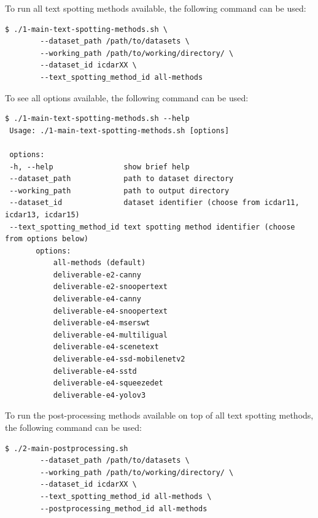To run all text spotting methods available, the following command can be used:

\begin{lstlisting}[style=fancyterminal]
 $ ./1-main-text-spotting-methods.sh \
        --dataset_path /path/to/datasets \
        --working_path /path/to/working/directory/ \
        --dataset_id icdarXX \
        --text_spotting_method_id all-methods
\end{lstlisting}

To see all options available, the following command can be used:
\begin{lstlisting}[style=fancyterminal]
 $ ./1-main-text-spotting-methods.sh --help
 Usage: ./1-main-text-spotting-methods.sh [options]
 
 options:
 -h, --help                show brief help
 --dataset_path            path to dataset directory
 --working_path            path to output directory
 --dataset_id              dataset identifier (choose from icdar11, icdar13, icdar15)
 --text_spotting_method_id text spotting method identifier (choose from options below)
       options:
           all-methods (default)
           deliverable-e2-canny
           deliverable-e2-snoopertext
           deliverable-e4-canny
           deliverable-e4-snoopertext
           deliverable-e4-mserswt
           deliverable-e4-multiligual
           deliverable-e4-scenetext
           deliverable-e4-ssd-mobilenetv2
           deliverable-e4-sstd
           deliverable-e4-squeezedet
           deliverable-e4-yolov3
\end{lstlisting}

To run the post-processing methods available on top of all text spotting methods, the following command can be used:

\begin{lstlisting}[style=fancyterminal]
 $ ./2-main-postprocessing.sh  
        --dataset_path /path/to/datasets \
        --working_path /path/to/working/directory/ \
        --dataset_id icdarXX \
        --text_spotting_method_id all-methods \
        --postprocessing_method_id all-methods
\end{lstlisting}

